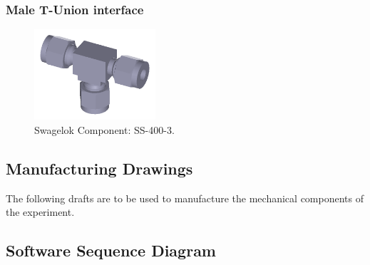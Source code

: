 \documentclass[a4paper,12pt,twoside]{article}
\begin{document}
\begin{appendices}
\subsubsection{Male T-Union interface}


\begin{figure}[H]
    \centering
    \includegraphics[width=0.4\textwidth]{appendix/img/interfaces/SS-400-3-SwagelokCompany-07-10-2018.png}
    \caption{Swagelok Component: SS-400-3.}
    \label{fig:T_interface}
\end{figure}


\newpage
\subsection{Manufacturing Drawings}
\label{sec:mech_drawings}

The following drafts are to be used to manufacture the mechanical components
of the experiment.


% 
% 





\newpage
\begin{landscape}
\subsection{Software Sequence Diagram} \label{sec:appB}


\end{landscape}
\end{appendices}
\end{document}
